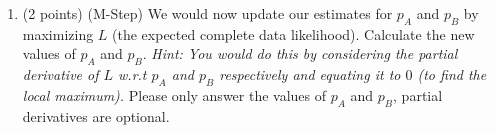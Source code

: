 \documentclass[11pt]{article}
\begin{document}
\begin{enumerate}[(1)]
\begin{enumerate}[(2.1)]
\textit{Hint: Recall $P(Z = 0) = P(Z = 1) = 0.5$. The complete data log-likelihood is defined as follows,
\[L = \sum_{i=1}^N\sum_{\alpha=0}^1\tau_{\alpha, x_i}\log p(X_i = x_i, Z = \alpha).\]
Here $X_i$ is the random variable indicating the outcome of the $i^{\textrm{th}}$ toss. For example $X_1 = x_1 = T$, $X_2 = x_2 = H$ and so on. }

\begin{answertext}{17cm}{}

\end{answertext}

\item (2 points) (M-Step) We would now update our estimates for $p_A$ and $p_B$ by maximizing $L$ (the expected complete data likelihood). Calculate the new values of $p_A$ and $p_B$. 
\textit{Hint: You would do this by considering the partial derivative of $L$ w.r.t $p_A$ and $p_B$ respectively and equating it to $0$ (to find the local maximum).} Please only answer the values of $p_A$ and $p_B$, partial derivatives are optional.



\end{enumerate}
\end{enumerate}
\end{document}
